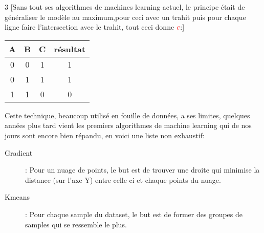 \begin{center}
\begin{multicols}{3}
[Sans tout ses algorithmes de machines learning actuel, le principe était de généraliser le modèle au maximum,pour ceci avec un trahit puis pour chaque ligne faire l'intersection avec le trahit, tout ceci donne $\textcolor{red}{c}$:]

\begin{tabular}{ccc|c}
A & B & C & résultat \\
\hline
0 & 0 & 1 & 1\\
0 & 1 & 1 & 1\\
1 & 1 & 0 & 0\\
\end{tabular}
\end{multicols}
\end{center}

Cette technique, beaucoup utilisé en fouille de données, a ses limites, quelques années plus tard vient les premiers algorithmes de machine learning qui de nos jours sont encore bien répandu, en voici une liste non exhaustif:

\begin{description}
\item[Gradient]: Pour un nuage de points, le but est de trouver une droite qui minimise la distance (sur l'axe Y) entre celle ci et chaque  points du nuage.
\item[Kmeans]: Pour chaque sample du dataset, le but est de former des groupes de samples qui se ressemble le plus.
\end{description}

